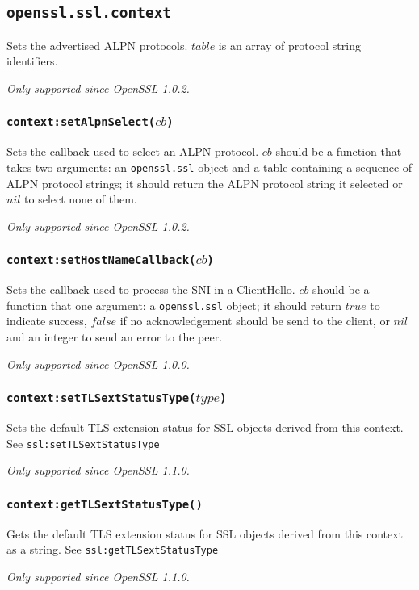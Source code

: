 \documentclass[11pt, oneside]{memoir}
\newcommand*{\fn}[1]{\texttt{#1}\xspace}
\newcommand*{\module}[1]{\texttt{#1}\xspace}
\newcounter{toccols}
\newenvironment{Module}[1]{
	\subsection{\texttt{#1}}
	\addtocontents{toc}{
		\protect\begin{multicols}{\value{toccols}}
	}
}{
	\addtocontents{toc}{\protect\end{multicols}}
}
\begin{document}
\begin{Module}{openssl.ssl.context}
Sets the advertised ALPN protocols. $table$ is an array of protocol string identifiers.

\emph{Only supported since OpenSSL 1.0.2.}

\subsubsection[\fn{context:setAlpnSelect}]{\fn{context:setAlpnSelect($cb$)}}

Sets the callback used to select an ALPN protocol. $cb$ should be a function that takes two arguments: an \module{openssl.ssl} object and a table containing a sequence of ALPN protocol strings; it should return the ALPN protocol string it selected or $nil$ to select none of them.

\emph{Only supported since OpenSSL 1.0.2.}

\subsubsection[\fn{context:setHostNameCallback}]{\fn{context:setHostNameCallback($cb$)}}

Sets the callback used to process the SNI in a ClientHello. $cb$ should be a function that one argument: a \module{openssl.ssl} object; it should return $true$ to indicate success, $false$ if no acknowledgement should be send to the client, or $nil$ and an integer to send an error to the peer.

\emph{Only supported since OpenSSL 1.0.0.}

\subsubsection[\fn{context:setTLSextStatusType}]{\fn{context:setTLSextStatusType($type$)}}

Sets the default TLS extension status for SSL objects derived from this context.
See \fn{ssl:setTLSextStatusType}

\emph{Only supported since OpenSSL 1.1.0.}

\subsubsection[\fn{context:getTLSextStatusType}]{\fn{context:getTLSextStatusType()}}

Gets the default TLS extension status for SSL objects derived from this context as a string.
See \fn{ssl:getTLSextStatusType}

\emph{Only supported since OpenSSL 1.1.0.}


\end{Module}
\end{document}
